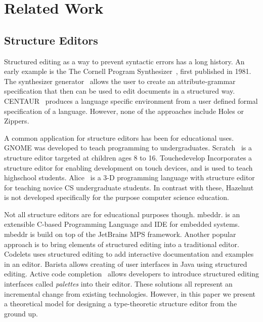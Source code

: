 \documentclass{llncs}
\begin{document}
\section{Related Work}
\subsection{Structure Editors}

Structured editing as a way to prevent syntactic errors has a long history.  An early example is the 
The Cornell Program Synthesizer~\cite{teitelbaum_cornell_1981}, first published in 1981.
The synthesizer generator~\cite{Reps:1984:SG:390010.808247} allows the user to create an attribute-grammar specification that then can be used to edit documents in a structured way.
CENTAUR~\cite{Borras:1988:CS:64140.65005} produces a language specific environment from a user defined formal specification of a language.  However, none of the approaches include Holes or Zippers.


A common application for structure editors has been for educational uses.  
GNOME\cite{garlan_gnome:_1984} was developed to teach programming to undergraduates.
Scratch~\cite{Resnick:2009:SP:1592761.1592779} is a structure editor targeted at children ages 8 to 16.
Touchedevelop \cite{tillmann_touchdevelop:_2011} Incorporates a structure editor for enabling development on touch devices, and is used to teach highschool students. 
Alice~\cite{Conway:2000:ALL:332040.332481} is a 3-D programming language with structure editor for teaching novice CS undergraduate students.
In contrast with these, Hazelnut is not developed specifically for the purpose computer science education. 

Not all structure editors are for educational purposes though.  
mbeddr. \cite{voelter_mbeddr:_2012} is an extensible C-based Programming Language and IDE for embedded systems.
mbeddr is build on top of the JetBrains MPS framework.  
Another popular approach is to bring elements of structured editing into a traditional editor. 
Codelets \cite{oney_codelets:_2012} uses structured editing to add interactive documentation and examples in an editor.
Barista\cite{ko_barista:_2006} allows creating of user interfaces in Java using structured editing.
Active code completion~\cite{Omar:2012:ACC:2337223.2337324} allows developers to introduce structured editing interfaces called  \emph{palettes} into their editor.
These solutions all represent an incremental change from existing technologies.  However, in this paper we present a theoretical model for designing a type-theoretic structure editor from the ground up.
\end{document}
